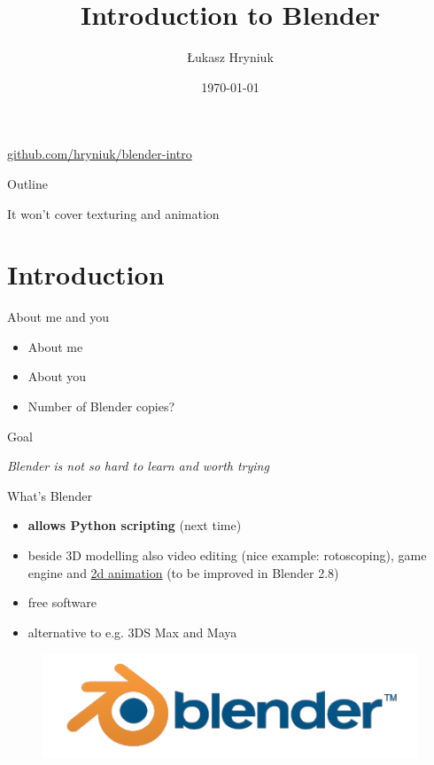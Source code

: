 \documentclass{beamer}
\title[Blender Intro]{Introduction to Blender}
\author{Łukasz Hryniuk}
\date{\today}
\begin{document}
\begin{frame}
  \titlepage
  \centering\href{https://github.com/hryniuk/blender-intro}{github.com/hryniuk/blender-intro}
\end{frame}

\begin{frame}{Outline}
  \tableofcontents
  
  \centering \Large It won't cover texturing and animation
\end{frame}

\section{Introduction}

\begin{frame}{About me and you}

\begin{itemize}
\item About me
\item About you
\item Number of Blender copies?
\end{itemize}

\end{frame}

\begin{frame}{Goal}

\centering \Huge
\emph{Blender is not so hard to learn and worth trying}

\end{frame}

\begin{frame}{What's Blender}

\begin{itemize}
  \item \textbf{allows Python scripting} (next time)
  \item beside 3D modelling also video editing (nice example: rotoscoping), game engine and \href{https://www.youtube.com/watch?v=L1Wl3YoRe8w}{2d animation} (to be improved in Blender 2.8)
  \item free software
  \item alternative to e.g. 3DS Max and Maya
\end{itemize}

\begin{figure}
\includegraphics[scale=0.15]{logo.png}
\end{figure}

\end{frame}
\end{document}

